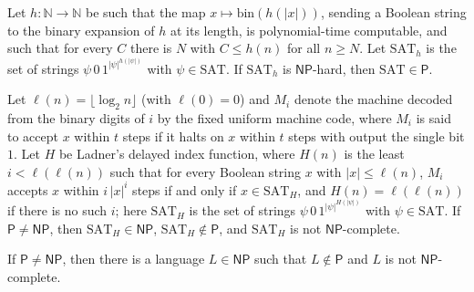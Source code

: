 \begin{theorem}
\label{Complexity.SAT_mem_P_of_padSAT_NPHard}
\leanok
{}
Let $h:\mathbb N\to\mathbb N$ be such that the map $x\mapsto\mathrm{bin}(h(|x|))$, sending a Boolean
string to the binary expansion of $h$ at its length, is polynomial-time computable, and such that
for every $C$ there is $N$ with $C\le h(n)$ for all $n\ge N$. Let $\mathrm{SAT}_h$ is the set of strings $\psi\,0\,1^{|\psi|^{h(|\psi|)}}$ with $\psi\in\mathrm{SAT}$. If $\mathrm{SAT}_h$ is
$\mathsf{NP}$-hard, then $\mathrm{SAT}\in\mathsf P$.
\end{theorem}

\begin{theorem}
\label{Complexity.SAT_H_intermediate}
\leanok
{}
Let $\ell(n)=\lfloor\log_2 n\rfloor$ (with $\ell(0)=0$) and $M_i$ denote the machine decoded from the binary digits of $i$ by the fixed uniform machine code, where $M_i$ is said to accept $x$ within $t$ steps if it halts on $x$ within $t$ steps with output the single bit $1$. Let $H$ be Ladner's delayed index function, where $H(n)$ is the least $i<\ell(\ell(n))$ such that for every Boolean string $x$ with $|x|\le\ell(n)$, $M_i$ accepts $x$ within $i\,|x|^i$ steps if and only if $x\in\mathrm{SAT}_H$, and $H(n)=\ell(\ell(n))$ if there is no such $i$; here $\mathrm{SAT}_H$ is the set of strings $\psi\,0\,1^{|\psi|^{H(|\psi|)}}$ with $\psi\in\mathrm{SAT}$. If $\mathsf P\ne\mathsf{NP}$, then
$\mathrm{SAT}_H\in\mathsf{NP}$, $\mathrm{SAT}_H\notin\mathsf P$, and $\mathrm{SAT}_H$ is not
$\mathsf{NP}$-complete.
\end{theorem}

\begin{theorem}
\label{Complexity.ladner}
\leanok
{}
If $\mathsf P\ne\mathsf{NP}$, then there is a language $L\in\mathsf{NP}$ such that
$L\notin\mathsf P$ and $L$ is not $\mathsf{NP}$-complete.
\end{theorem}
